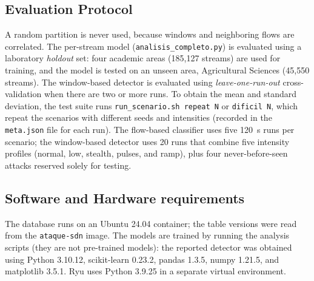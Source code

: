\documentclass[ASNA,twocolumn]{USG}
\begin{document}
  \subsection{Evaluation Protocol}

  A random partition is never used, because windows and neighboring flows are correlated. The per-stream model (\texttt{analisis\_completo.py}) is evaluated using a laboratory \emph{holdout} set: four academic areas (185,127 streams) are used for training, and the model is tested on an unseen area, Agricultural Sciences (45,550 streams). The window-based detector is evaluated using \emph{leave-one-run-out} cross-validation when there are two or more runs. To obtain the mean and standard deviation, the test suite runs \texttt{run\_scenario.sh repeat N} or \texttt{dificil N}, which repeat the scenarios with different seeds and intensities (recorded in the \texttt{meta.json} file for each run). The flow-based classifier uses five 120~s runs per scenario; the window-based detector uses 20 runs that combine five intensity profiles (normal, low, stealth, pulses, and ramp), plus four never-before-seen attacks reserved solely for testing.

  \subsection{Software and Hardware requirements}

  The database runs on an Ubuntu 24.04 container; the table versions were read from the \texttt{ataque-sdn} image. The models are trained by running the analysis scripts (they are not pre-trained models): the reported detector was obtained using Python 3.10.12, scikit-learn 0.23.2, pandas 1.3.5, numpy 1.21.5, and matplotlib 3.5.1. Ryu uses Python 3.9.25 in a separate virtual environment.
\end{document}
